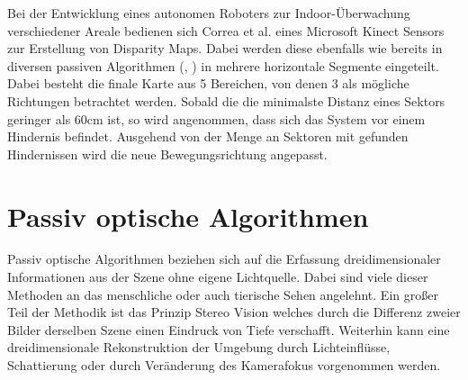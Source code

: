 \noindent
Bei der Entwicklung eines autonomen Roboters zur Indoor-Überwachung verschiedener Areale bedienen sich Correa et al. \cite{correa2012mobile} eines Microsoft Kinect Sensors zur Erstellung von Disparity Maps. Dabei werden diese ebenfalls wie bereits in diversen passiven Algorithmen (\cite{pire2012stereo}, \cite{kostavelis2010comparative}) in mehrere horizontale Segmente eingeteilt. Dabei besteht die finale Karte aus 5 Bereichen, von denen 3 als mögliche Richtungen betrachtet werden. Sobald die die minimalste Distanz eines Sektors geringer als 60cm ist, so wird angenommen, dass sich das System vor einem Hindernis befindet. Ausgehend von der Menge an Sektoren mit gefunden Hindernissen wird die neue Bewegungsrichtung angepasst.

\section{Passiv optische Algorithmen}
\label{sec:sensor_basierte_he}
Passiv optische Algorithmen beziehen sich auf die Erfassung dreidimensionaler Informationen aus der Szene ohne eigene Lichtquelle. Dabei sind viele dieser Methoden an das menschliche oder auch tierische Sehen angelehnt. Ein großer Teil der Methodik ist das Prinzip Stereo Vision welches durch die Differenz zweier Bilder derselben Szene einen Eindruck von Tiefe verschafft. Weiterhin kann eine dreidimensionale Rekonstruktion der Umgebung durch Lichteinflüsse, Schattierung oder durch Veränderung des Kamerafokus vorgenommen werden.\\


